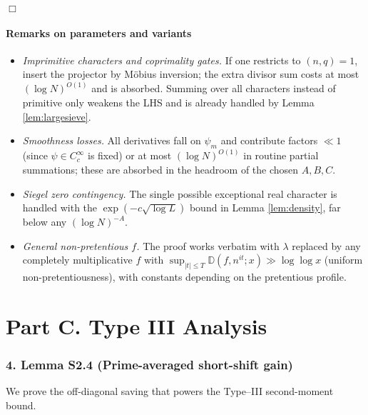 \documentclass[11pt]{article}
\theoremstyle{definition}
\theoremstyle{remark}
\begin{document}
\hfill$\Box$

\subsection*{Remarks on parameters and variants}
\begin{itemize}[leftmargin=1.7em]
\item \emph{Imprimitive characters and coprimality gates.} If one restricts to $(n,q)=1$, insert the projector by Möbius inversion; the extra divisor sum costs at most $(\log N)^{O(1)}$ and is absorbed. Summing over all characters instead of primitive only weakens the LHS and is already handled by Lemma \ref{lem:largesieve}.
\item \emph{Smoothness losses.} All derivatives fall on $\psi_m$ and contribute factors $\ll 1$ (since $\psi\in C_c^\infty$ is fixed) or at most $(\log N)^{O(1)}$ in routine partial summations; these are absorbed in the headroom of the chosen $A,B,C$.
\item \emph{Siegel zero contingency.} The single possible exceptional real character is handled with the $\exp(-c\sqrt{\log L})$ bound in Lemma \ref{lem:density}, far below any $(\log N)^{-A}$.
\item \emph{General non-pretentious $f$.} The proof works verbatim with $\lambda$ replaced by any completely multiplicative $f$ with $\sup_{|t|\le T}\mathbb D(f,n^{it};x)\gg \log\log x$ (uniform non-pretentiousness), with constants depending on the pretentious profile.
\end{itemize}

\part*{Part C. Type III Analysis}

\section*{4. Lemma S2.4 (Prime-averaged short-shift gain)}

We prove the off-diagonal saving that powers the Type–III second-moment bound.
\end{document}
